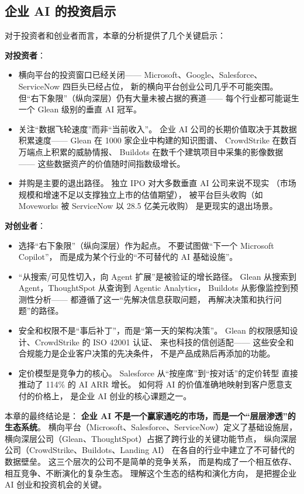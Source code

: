 \subsection{企业 AI 的投资启示}

对于投资者和创业者而言，本章的分析提供了几个关键启示：

\textbf{对投资者}：
\begin{itemize}[noitemsep]
  \item 横向平台的投资窗口已经关闭——
        Microsoft、Google、Salesforce、ServiceNow 四巨头已经占位，
        新的横向平台创业公司几乎不可能突围。
        但``右下象限''（纵向深层）仍有大量未被占据的赛道——
        每个行业都可能诞生一个 Glean 级别的垂直 AI 冠军。
  \item 关注``数据飞轮速度''而非``当前收入''。
        企业 AI 公司的长期价值取决于其数据积累速度——
        Glean 在 1000 家企业中构建的知识图谱、
        CrowdStrike 在数百万端点上积累的威胁情报、
        Buildots 在数千个建筑项目中采集的影像数据——
        这些数据资产的价值随时间指数级增长。
  \item 并购是主要的退出路径。
        独立 IPO 对大多数垂直 AI 公司来说不现实
        （市场规模和增速不足以支撑独立上市的估值期望），
        被平台巨头收购（如 Moveworks 被 ServiceNow 以 28.5 亿美元收购）
        是更现实的退出场景。
\end{itemize}

\textbf{对创业者}：
\begin{itemize}[noitemsep]
  \item 选择``右下象限''（纵向深层）作为起点。
        不要试图做``下一个 Microsoft Copilot''，
        而是成为某个行业的``不可替代的 AI 基础设施''。
  \item ``从搜索/可见性切入，向 Agent 扩展''是被验证的增长路径。
        Glean 从搜索到 Agent，ThoughtSpot 从查询到 Agentic Analytics，
        Buildots 从影像监控到预测性分析——
        都遵循了这一``先解决信息获取问题，
        再解决决策和执行问题''的路径。
  \item 安全和权限不是``事后补丁''，而是``第一天的架构决策''。
        Glean 的权限感知设计、CrowdStrike 的 ISO 42001 认证、
        来也科技的信创适配——
        这些安全和合规能力是企业客户决策的先决条件，
        不是产品成熟后再添加的功能。
  \item 定价模型是竞争力的核心。
        Salesforce 从``按座席''到``按对话''的定价转型
        直接推动了 114\% 的 AI ARR 增长。
        如何将 AI 的价值准确地映射到客户愿意支付的价格上，
        是企业 AI 创业的核心课题之一。
\end{itemize}

本章的最终结论是：
\textbf{企业 AI 不是一个赢家通吃的市场，而是一个``层层渗透''的生态系统}。
横向平台（Microsoft、Salesforce、ServiceNow）定义了基础设施层，
横向深层公司（Glean、ThoughtSpot）占据了跨行业的关键功能节点，
纵向深层公司（CrowdStrike、Buildots、Landing AI）
在各自的行业中建立了不可替代的数据壁垒。
这三个层次的公司不是简单的竞争关系，
而是构成了一个相互依存、相互竞争、不断演化的复杂生态。
理解这个生态的结构和演化方向，
是把握企业 AI 创业和投资机会的关键。
